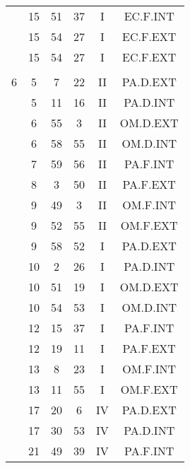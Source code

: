 \documentclass[12pt, a4paper]{article}
\begin{document}
\begin{multicols}{3}
{\begin{tabular}{c c c c c c}
	 	 	 	 & 15 & 51 & 37 & I & EC.F.INT\\%
	 	 	 	 & 15 & 54 & 27 & I & EC.F.EXT\\%
	 	 	 	 & 15 & 54 & 27 & I & EC.F.EXT\\%
	 	 	 	 & & & & & \\%
	 	 	 	6 & 5 & 7 & 22 & II & PA.D.EXT\\%
	 	 	 	 & 5 & 11 & 16 & II & PA.D.INT\\%
	 	 	 	 & 6 & 55 & 3 & II & OM.D.EXT\\%
	 	 	 	 & 6 & 58 & 55 & II & OM.D.INT\\%
	 	 	 	 & 7 & 59 & 56 & II & PA.F.INT\\%
	 	 	 	 & 8 & 3 & 50 & II & PA.F.EXT\\%
	 	 	 	 & 9 & 49 & 3 & II & OM.F.INT\\%
	 	 	 	 & 9 & 52 & 55 & II & OM.F.EXT\\%
	 	 	 	 & 9 & 58 & 52 & I & PA.D.EXT\\%
	 	 	 	 & 10 & 2 & 26 & I & PA.D.INT\\%
	 	 	 	 & 10 & 51 & 19 & I & OM.D.EXT\\%
	 	 	 	 & 10 & 54 & 53 & I & OM.D.INT\\%
	 	 	 	 & 12 & 15 & 37 & I & PA.F.INT\\%
	 	 	 	 & 12 & 19 & 11 & I & PA.F.EXT\\%
	 	 	 	 & 13 & 8 & 23 & I & OM.F.INT\\%
	 	 	 	 & 13 & 11 & 55 & I & OM.F.EXT\\%
	 	 	 	 & 17 & 20 & 6 & IV & PA.D.EXT\\%
	 	 	 	 & 17 & 30 & 53 & IV & PA.D.INT\\%
	 	 	 	 & 21 & 49 & 39 & IV & PA.F.INT\\%

\end{tabular}}
\end{multicols}
\end{document}
